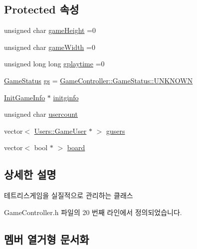 \subsection*{Protected 속성}
\begin{DoxyCompactItemize}
\item 
unsigned char \hyperlink{class_tetris_1_1_game_controller_a8e3adc647ed382de0ff541417bea9b33}{game\+Height} =0
\item 
unsigned char \hyperlink{class_tetris_1_1_game_controller_a439f215918db4127fcb44cf9d501ed63}{game\+Width} =0
\item 
unsigned long long \hyperlink{class_tetris_1_1_game_controller_a562adcade20e362160535cd7248a2cce}{gplaytime} =0
\item 
\hyperlink{class_tetris_1_1_game_controller_a96a963b56385f3b3a122ff0ca2beb770}{Game\+Status} \hyperlink{class_tetris_1_1_game_controller_ae4c894005a82404c73a5a9a6efb208dc}{gs} = \hyperlink{class_tetris_1_1_game_controller_a96a963b56385f3b3a122ff0ca2beb770a696b031073e74bf2cb98e5ef201d4aa3}{Game\+Controller\+::\+Game\+Status\+::\+U\+N\+K\+N\+O\+WN}
\item 
\hyperlink{class_tetris_1_1_init_game_info}{Init\+Game\+Info} $\ast$ \hyperlink{class_tetris_1_1_game_controller_adaefa9bbdd0d73ec58173dce327373ca}{initginfo}
\item 
unsigned char \hyperlink{class_tetris_1_1_game_controller_aafb18b3b4fe5621bfb60fc42b1e8da09}{usercount}
\item 
vector$<$ \hyperlink{class_tetris_1_1_users_1_1_game_user}{Users\+::\+Game\+User} $\ast$ $>$ \hyperlink{class_tetris_1_1_game_controller_a1a31d3a933daad6d95e20458eea2900e}{gusers}
\item 
vector$<$ bool $\ast$ $>$ \hyperlink{class_tetris_1_1_game_controller_a7725b6cec9459a6bffaa3e29dd1c5196}{board}
\end{DoxyCompactItemize}


\subsection{상세한 설명}
테트리스게임을 실질적으로 관리하는 클래스 

Game\+Controller.\+h 파일의 20 번째 라인에서 정의되었습니다.



\subsection{멤버 열거형 문서화}
\mbox{\label{class_tetris_1_1_game_controller_a96a963b56385f3b3a122ff0ca2beb770}} 
